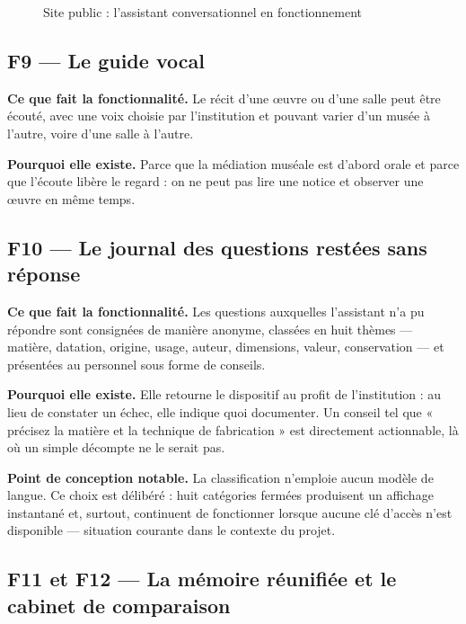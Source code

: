 \begin{figure}[htbp]
\centering
{}
\caption{Site public : l'assistant conversationnel en fonctionnement}
\label{fig:cap-guide}
\end{figure}

\subsection{F9 — Le guide vocal}

\textbf{Ce que fait la fonctionnalité.} Le récit d'une œuvre ou d'une salle peut
être écouté, avec une voix choisie par l'institution et pouvant varier d'un
musée à l'autre, voire d'une salle à l'autre.

\textbf{Pourquoi elle existe.} Parce que la médiation muséale est d'abord orale
et parce que l'écoute libère le regard : on ne peut pas lire une notice et
observer une œuvre en même temps.

\subsection{F10 — Le journal des questions restées sans réponse}

\textbf{Ce que fait la fonctionnalité.} Les questions auxquelles l'assistant n'a
pu répondre sont consignées de manière anonyme, classées en huit thèmes
— matière, datation, origine, usage, auteur, dimensions, valeur, conservation —
et présentées au personnel sous forme de conseils.

\textbf{Pourquoi elle existe.} Elle retourne le dispositif au profit de
l'institution : au lieu de constater un échec, elle indique quoi documenter.
Un conseil tel que « précisez la matière et la technique de fabrication » est
directement actionnable, là où un simple décompte ne le serait pas.

\textbf{Point de conception notable.} La classification n'emploie aucun modèle
de langue. Ce choix est délibéré : huit catégories fermées produisent un
affichage instantané et, surtout, continuent de fonctionner lorsque aucune clé
d'accès n'est disponible — situation courante dans le contexte du projet.

\subsection{F11 et F12 — La mémoire réunifiée et le cabinet de comparaison}

